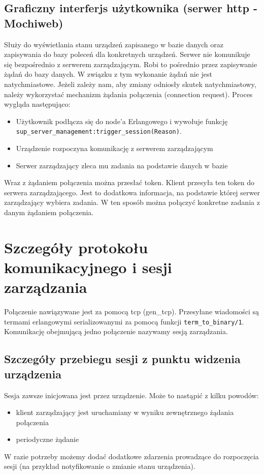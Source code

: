 \documentclass[polish,12pt]{aghthesis}
\begin{document}
\subsection{Graficzny interferjs użytkownika (serwer http - Mochiweb)}
Służy do wyświetlania stanu urządzeń zapisanego w bazie danych oraz zapisywania do bazy poleceń dla konkretnych urządzeń. Serwer nie komunikuje się bezpośrednio z serwerem zarządzającym. Robi to pośrednio przez zapisywanie żądań do bazy danych. W związku z tym wykonanie żądań nie jest natychmiastowe. Jeżeli zależy nam, aby zmiany odniosły skutek natychmiastowy, należy wykorzystać mechanizm żądania połączenia (connection request). Proces wygląda następująco:
\begin{itemize}
\item Użytkownik podłącza się do node'a Erlangowego i wywołuje funkcję \verb|sup_server_management:trigger_session(Reason)|.
\item Urządzenie rozpoczyna komunikację z serwerem zarządzającym
\item Serwer zarządzający zleca mu zadania na podstawie danych w bazie
\end{itemize}
Wraz z żądaniem połączenia można przesłać token. Klient przesyła ten token do serwera zarządzającego. Jest to dodatkowa informacja, na podstawie której serwer zarządzający wybiera zadania. W ten sposób można połączyć konkretne zadania z danym żądaniem połączenia.

\section{Szczegóły protokołu komunikacyjnego i sesji zarządzania}
Połączenie nawiązywane jest za pomocą tcp (gen\_tcp). Przesyłane wiadomości są termami erlangowymi serializowanymi za pomocą funkcji \verb|term_to_binary/1|. Komunikację obejmującą jedno połączenie nazywamy sesją zarządzania.

\subsection{Szczegóły przebiegu sesji z punktu widzenia urządzenia}
Sesja zawsze inicjowana jest przez urządzenie. Może to nastąpić z kilku powodów:
\begin{itemize}
\item klient zarządzający jest uruchamiany w wyniku zewnętrznego żądania połączenia
\item periodyczne żądanie
\end{itemize}
W razie potrzeby możemy dodać dodatkowe zdarzenia prowadzące do rozpoczęcia sesji (na przykład notyfikowanie o zmianie stanu urządzenia).
\end{document}
